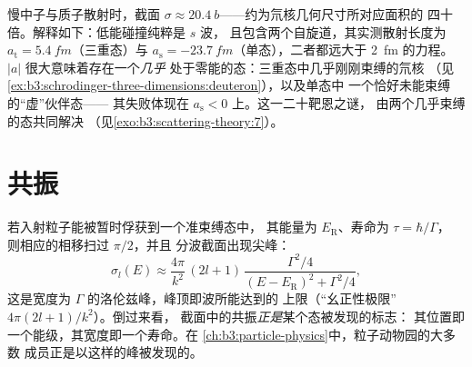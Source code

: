 \begin{example}[中子遇见质子]\label{ex:b3:scattering-theory:np}
慢中子与质子散射时，截面 $\sigma \approx
\qty{20.4}{b}$——约为氘核几何尺寸所对应面积的
四十倍。解释如下：低能碰撞纯粹是 $s$ 波，
且包含两个自旋道，其实测散射长度为
$a_{\text{t}} = \qty{5.4}{fm}$（三重态）与 $a_{\text{s}} =
\qty{-23.7}{fm}$（单态），二者都远大于
\qty{2}{fm} 的力程。$|a|$ 很大意味着存在一个\emph{几乎}
处于零能的态：三重态中几乎刚刚束缚的氘核
（见\cref{ex:b3:schrodinger-three-dimensions:deuteron}），以及单态中
一个恰好未能束缚的“虚”伙伴态——
其失败体现在 $a_{\text{s}} < 0$ 上。这一二十靶恩之谜，
由两个几乎束缚的态共同解决
（见\cref{exo:b3:scattering-theory:7}）。
\end{example}

\section{共振}

\begin{proposition}\label{prop:b3:scattering-theory:resonance}
若入射粒子能被暂时俘获到一个准束缚态中，
其能量为 $E_{\text{R}}$、寿命为 $\tau = \hbar/\Gamma$，
则相应的相移扫过 $\pi/2$，并且
分波截面出现尖峰：
\[
\sigma_l(E) \approx \frac{4\pi}{k^2}\,(2l+1)\,
\frac{\Gamma^2/4}{(E - E_{\text{R}})^2 + \Gamma^2/4} ,
\]
这是宽度为 $\Gamma$ 的洛伦兹峰，峰顶即波所能达到的
上限（“幺正性极限” $4\pi(2l+1)/k^2$）。倒过来看，
截面中的共振\emph{正是}某个态被发现的标志：
其位置即一个能级，其宽度即一个寿命。在
\cref{ch:b3:particle-physics}中，粒子动物园的大多数
成员正是以这样的峰被发现的。
\end{proposition}
\admitted

